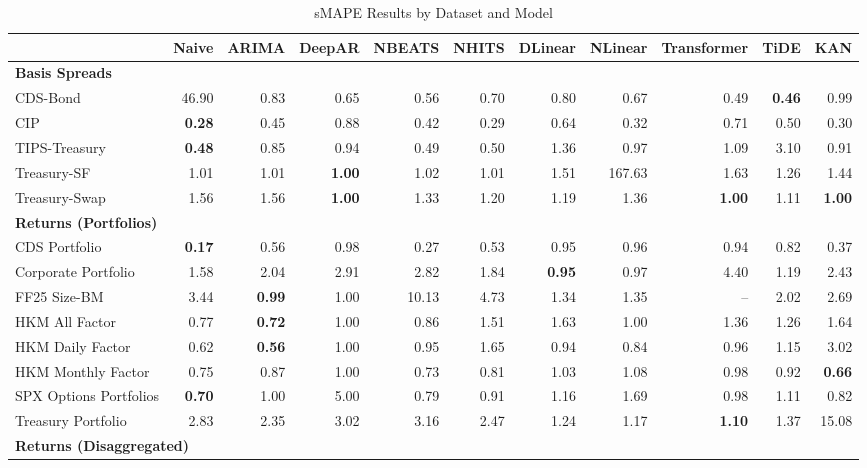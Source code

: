 
\begin{table}[htbp]
\centering
\caption{sMAPE Results by Dataset and Model}
\label{tab:smape_results}
\scriptsize
\setlength{\tabcolsep}{1.5pt}
\renewcommand{\arraystretch}{0.9}
\begin{tabular}{@{}lrrrrrrrrrr@{}}
\toprule
 & Naive & ARIMA & DeepAR & NBEATS & NHITS & DLinear & NLinear & Transformer & TiDE & KAN \\
\midrule
\multicolumn{11}{l}{\textbf{Basis Spreads}} \\
CDS-Bond & 46.90 & 0.83 & 0.65 & 0.56 & 0.70 & 0.80 & 0.67 & 0.49 & \textbf{0.46} & 0.99 \\
CIP & \textbf{0.28} & 0.45 & 0.88 & 0.42 & 0.29 & 0.64 & 0.32 & 0.71 & 0.50 & 0.30 \\
TIPS-Treasury & \textbf{0.48} & 0.85 & 0.94 & 0.49 & 0.50 & 1.36 & 0.97 & 1.09 & 3.10 & 0.91 \\
Treasury-SF & 1.01 & 1.01 & \textbf{1.00} & 1.02 & 1.01 & 1.51 & 167.63 & 1.63 & 1.26 & 1.44 \\
Treasury-Swap & 1.56 & 1.56 & \textbf{1.00} & 1.33 & 1.20 & 1.19 & 1.36 & \textbf{1.00} & 1.11 & \textbf{1.00} \\
\midrule
\multicolumn{11}{l}{\textbf{Returns (Portfolios)}} \\
CDS Portfolio & \textbf{0.17} & 0.56 & 0.98 & 0.27 & 0.53 & 0.95 & 0.96 & 0.94 & 0.82 & 0.37 \\
Corporate Portfolio & 1.58 & 2.04 & 2.91 & 2.82 & 1.84 & \textbf{0.95} & 0.97 & 4.40 & 1.19 & 2.43 \\
FF25 Size-BM & 3.44 & \textbf{0.99} & 1.00 & 10.13 & 4.73 & 1.34 & 1.35 & -- & 2.02 & 2.69 \\
HKM All Factor & 0.77 & \textbf{0.72} & 1.00 & 0.86 & 1.51 & 1.63 & 1.00 & 1.36 & 1.26 & 1.64 \\
HKM Daily Factor & 0.62 & \textbf{0.56} & 1.00 & 0.95 & 1.65 & 0.94 & 0.84 & 0.96 & 1.15 & 3.02 \\
HKM Monthly Factor & 0.75 & 0.87 & 1.00 & 0.73 & 0.81 & 1.03 & 1.08 & 0.98 & 0.92 & \textbf{0.66} \\
SPX Options Portfolios & \textbf{0.70} & 1.00 & 5.00 & 0.79 & 0.91 & 1.16 & 1.69 & 0.98 & 1.11 & 0.82 \\
Treasury Portfolio & 2.83 & 2.35 & 3.02 & 3.16 & 2.47 & 1.24 & 1.17 & \textbf{1.10} & 1.37 & 15.08 \\
\midrule
\multicolumn{11}{l}{\textbf{Returns (Disaggregated)}} \\

\end{tabular}
\end{table}
